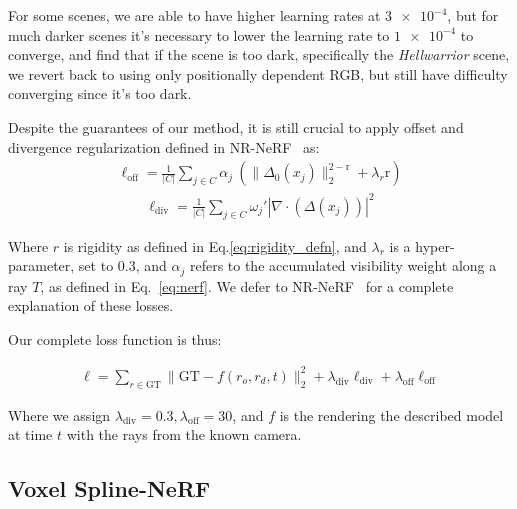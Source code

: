 For some scenes, we are able to have higher learning rates at $\num{3e-4}$, but for much darker scenes it's necessary to lower the learning rate to $\num{1e-4}$ to converge, and find that if the scene is too dark, specifically the \textit{Hellwarrior} scene, we revert back to using only positionally dependent RGB, but still have difficulty converging since it's too dark.

Despite the guarantees of our method, it is still crucial to apply offset and divergence regularization defined in NR-NeRF~\cite{tretschk2021nonrigid} as:
\begin{align}
\ell_{\text{off}} = \frac{1}{|C|} \sum_{j\in C} \alpha_j \
    (\lVert \Delta_0(x_j) \rVert_2^{2-\text{r}}+\lambda_r \text{r})
\end{align}
\begin{align}
    \ell_{\text{div}} = \frac{1}{|C|} \sum_{j\in C} \omega_j' |\nabla\cdot(\Delta(x_j))|^2
\end{align}

Where $r$ is rigidity as defined in Eq.\ref{eq:rigidity_defn}, and $\lambda_r$ is a hyper-parameter, set to 0.3, and $\alpha_j$ refers to the accumulated visibility weight along a ray $T$, as defined in Eq.~\ref{eq:nerf}. We defer to NR-NeRF~\cite{tretschk2021nonrigid} for a complete explanation of these losses.

Our complete loss function is thus:

\begin{align}
    \ell = \sum\limits_{r\in\text{GT}}\lVert\text{GT} - f(r_o, r_d, t)\rVert_2^2 + \lambda_{\text{div}}\ell_\text{div} + \lambda_\text{off}\ell_\text{off}
\end{align}

Where we assign $\lambda_\text{div} = 0.3, \lambda_\text{off} = 30$, and $f$ is the rendering the described model at time $t$ with the rays from the known camera.

\subsection*{Voxel Spline-NeRF}

